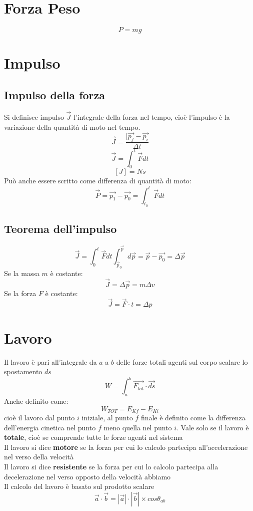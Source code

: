 \documentclass[a4paper]{report}
\begin{document}
  \section{Forza Peso}
  $$ P = mg $$

  \section{Impulso}
  \subsection{Impulso della forza}
  Si definisce impulso $ \vec{J} $ l'integrale della forza nel tempo, cioè l'impulso è la variazione della quantità di moto nel tempo.
  $$ \vec{J} = \frac{|\vec{p_f} - \vec{p_i}}{\Delta t}$$
  $$ \vec{J} = \int_0^t \vec{F} dt $$
  $$ [J] = N  s $$
  Può anche essere scritto come differenza di quantità di moto:
  $$\vec{P} = \vec{p_1} - \vec{p_0} = \int_{t_0}^t \vec{F} dt $$

  \subsection{Teorema dell'impulso}
  $$ \vec{J} = \int_0^t \vec{F} dt \int_{\vec{p}_0}^{\vec{p}} d\vec{p} = \vec{p} - \vec{p_0} = \Delta \vec{p} $$
  Se la massa $m$ è costante:
  $$ \vec{J} = \Delta \vec{p} = m \Delta v $$
  Se la forza $F$ è costante:
  $$ \vec{J} = \vec{F} \cdot t = \Delta p  $$

  \section{Lavoro}
  Il lavoro è pari all'integrale da $a$ a $b$ delle forze totali agenti sul corpo scalare lo spostamento $ds$
  $$ W = \int_{a}^{b} \vec{F_{tot}} \cdot \vec{ds} $$
  Anche definito come:
  $$ W_{TOT} = E_{Kf} - E_{Ki} $$
  cioè il lavoro dal punto $i$ iniziale, al punto $f$ finale è definito come la differenza dell'energia cinetica nel punto $f$ meno quella nel punto $i$. Vale solo se il lavoro è \textbf{totale}, cioè se comprende tutte le forze agenti nel sistema\\
  Il lavoro si dice \textbf{motore} se la forza per cui lo calcolo partecipa all'accelerazione nel verso della velocità\\
  Il lavoro si dice \textbf{resistente} se la forza per cui lo calcolo partecipa alla decelerazione nel verso opposto della velocità
  abbiamo\\
  Il calcolo del lavoro è basato sul prodotto scalare $$\vec{a} \cdot \vec{b} = |\vec{a}| \cdot |\vec{b}| \times cos \theta_{ab}$$
\end{document}
